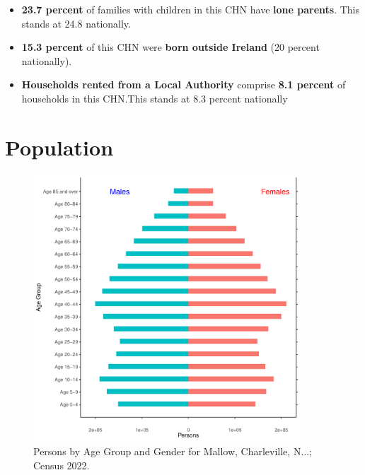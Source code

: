 \documentclass{article}
\begin{document}
\begin{itemize}
\item \textbf{23.7 percent} of families with children in this CHN have \textbf{lone parents}. This stands at 24.8 nationally.

\item \textbf{15.3 percent} of this CHN were \textbf{born outside Ireland} (20 percent nationally).

\item \textbf{Households rented from a Local Authority} comprise \textbf{8.1 percent} of households in this CHN.This stands at 8.3 percent nationally

\end{itemize}

\pagebreak

\section{Population} 
\label{sect:Pop}

\begin{figure}[h]
	\centering
	\includegraphics[width = 100mm]{../figures/PyramidPlot.pdf}
	\caption{Persons by Age Group and Gender for Mallow, Charleville, N...; Census 2022.}
	\label{fig:2ae19629-1a6a-13a3-e055-000000000001}
	\end{figure}
\end{document}

